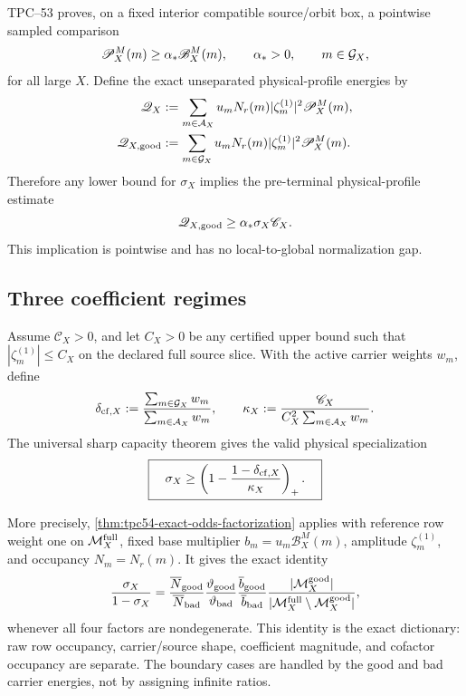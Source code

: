 TPC--53 proves, on a fixed interior compatible source/orbit box, a
pointwise sampled comparison
\begin{equation}
 \mathscr P_X^M(m)\ge\alpha_*\mathscr B_X^M(m),
 \qquad \alpha_*>0,\qquad m\in\mathcal G_X,
 \label{eq:tpc54-profile-pointwise}
\end{equation}
for all large \(X\).  Define the exact unseparated physical-profile
energies by
\begin{align}
 \mathscr Q_X
 &:=\sum_{m\in\mathcal A_X}
 u_mN_r(m)|\zeta_m^{(1)}|^2\mathscr P_X^M(m),
 \label{eq:tpc54-physical-total-energy}\\
 \mathscr Q_{X,\rm good}
 &:=\sum_{m\in\mathcal G_X}
 u_mN_r(m)|\zeta_m^{(1)}|^2\mathscr P_X^M(m).
 \label{eq:tpc54-physical-good-energy}
\end{align}
Therefore any lower bound for \(\sigma_X\) implies the pre-terminal
physical-profile estimate
\begin{equation}
 \mathscr Q_{X,\rm good}
 \ge \alpha_*\sigma_X\mathscr C_X.
 \label{eq:tpc54-selected-profile}
\end{equation}
This implication is pointwise and has no local-to-global normalization
gap.

\subsection{Three coefficient regimes}

Assume \(\mathscr C_X>0\), and let \(C_X>0\) be any certified upper bound
such that \(|\zeta_m^{(1)}|\le C_X\) on the declared full source slice.
With the active carrier weights \(w_m\), define
\begin{equation}
 \delta_{{\rm cf},X}
 :=\frac{\sum_{m\in\mathcal G_X}w_m}
         {\sum_{m\in\mathcal A_X}w_m},
 \qquad
 \kappa_X
 :=\frac{\mathscr C_X}
 {C_X^2\sum_{m\in\mathcal A_X}w_m}.
 \label{eq:tpc54-physical-delta-kappa}
\end{equation}
The universal sharp capacity theorem gives the valid physical
specialization
\begin{equation}
 \boxed{\quad
 \sigma_X\ge
 \left(1-\frac{1-\delta_{{\rm cf},X}}{\kappa_X}
 \right)_+.
 \quad}
 \label{eq:tpc54-physical-capacity}
\end{equation}

More precisely, \cref{thm:tpc54-exact-odds-factorization} applies with
reference row weight one on \(\mathcal M_X^{\rm full}\), fixed base multiplier
\(b_m=u_m\mathscr B_X^M(m)\), amplitude
\(\zeta_m^{(1)}\), and occupancy \(N_m=N_r(m)\).  It gives the exact
identity
\begin{equation}
 \frac{\sigma_X}{1-\sigma_X}
 =\frac{\overline N_{\rm good}}{\overline N_{\rm bad}}
  \frac{\vartheta_{\rm good}}{\vartheta_{\rm bad}}
  \frac{\overline b_{\rm good}}{\overline b_{\rm bad}}
  \frac{|\mathcal M_X^{\rm good}|}
       {|\mathcal M_X^{\rm full}\setminus\mathcal M_X^{\rm good}|},
 \label{eq:tpc54-physical-exact-odds}
\end{equation}
whenever all four factors are nondegenerate.  This identity is the exact
dictionary: raw row occupancy, carrier/source shape, coefficient
magnitude, and cofactor occupancy are separate.  The boundary cases are
handled by the good and bad carrier energies, not by assigning infinite
ratios.

